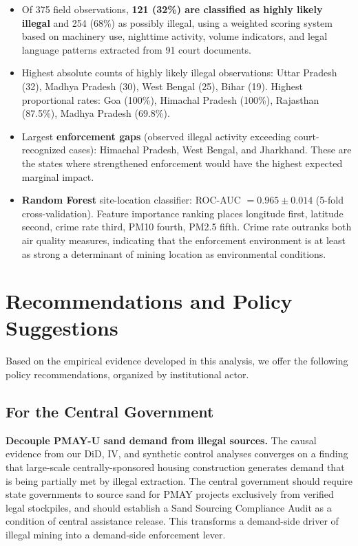 \documentclass[12pt]{article}
\begin{document}
\begin{itemize}
    \item Of 375 field observations, \textbf{121 (32\%) are classified as highly likely illegal} and 254 (68\%) as possibly illegal, using a weighted scoring system based on machinery use, nighttime activity, volume indicators, and legal language patterns extracted from 91 court documents.
    \item Highest absolute counts of highly likely illegal observations: Uttar Pradesh (32), Madhya Pradesh (30), West Bengal (25), Bihar (19). Highest proportional rates: Goa (100\%), Himachal Pradesh (100\%), Rajasthan (87.5\%), Madhya Pradesh (69.8\%).
    \item Largest \textbf{enforcement gaps} (observed illegal activity exceeding court-recognized cases): Himachal Pradesh, West Bengal, and Jharkhand. These are the states where strengthened enforcement would have the highest expected marginal impact.
    \item \textbf{Random Forest} site-location classifier: ROC-AUC $= 0.965 \pm 0.014$ (5-fold cross-validation). Feature importance ranking places longitude first, latitude second, crime rate third, PM10 fourth, PM2.5 fifth. Crime rate outranks both air quality measures, indicating that the enforcement environment is at least as strong a determinant of mining location as environmental conditions.
\end{itemize}

\section{Recommendations and Policy Suggestions}

Based on the empirical evidence developed in this analysis, we offer the following policy recommendations, organized by institutional actor.

\subsection{For the Central Government}

\textbf{Decouple PMAY-U sand demand from illegal sources.} The causal evidence from our DiD, IV, and synthetic control analyses converges on a finding that large-scale centrally-sponsored housing construction generates demand that is being partially met by illegal extraction. The central government should require state governments to source sand for PMAY projects exclusively from verified legal stockpiles, and should establish a Sand Sourcing Compliance Audit as a condition of central assistance release. This transforms a demand-side driver of illegal mining into a demand-side enforcement lever.
\end{document}
